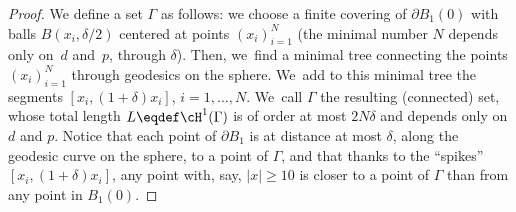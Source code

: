 \begin{proof}
We define a set $\Gamma$ as follows: we choose a finite covering of
$\partial B_1(0)$ with balls $B(x_i,\delta/2)$ centered
at points $(x_i)_{i=1}^N$ (the minimal number $N$ depends only on~$d$ and~$p$, through $\delta$).
Then, we~find a minimal tree connecting the points $(x_i)_{i=1}^N$ through geodesics on the sphere. We~add to this minimal tree the segments $[x_i,(1+\delta)x_i]$, $i=1,\dots,N$. We~call $\Gamma$ the resulting (connected) set,
whose total length $L\eqdef \cH^1(\Gamma)$ is of order at most $2N\delta$ and depends
only on $d$ and $p$.
Notice that each point of $\partial B_1$ is at distance at most $\delta$,
along the geodesic curve on the sphere, to a point of $\Gamma$, and that thanks to
the ``spikes'' $[x_i,(1+\delta) x_i]$, any point with, say, $|x|\ge 10$ is closer to
a point of $\Gamma$ than from any point in $B_1(0)$.


\end{proof}
